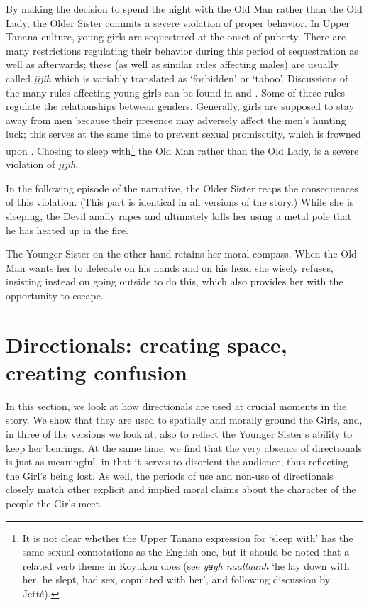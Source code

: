 By making the decision to spend the night with the Old Man rather than the Old Lady, the Older Sister commits a severe violation of proper behavior. In Upper Tanana culture, young girls are sequestered at the onset of puberty. There are many restrictions regulating their behavior during this period of sequestration as well as afterwards; these (as well as similar rules affecting males) are usually called {\em įįjih} which is variably translated as `forbidden' or `taboo'. Discussions of the many rules affecting young girls can be found in \citet{TyoneM1996} and \citet{DavidCforthc}. Some of these rules regulate the relationships between genders. Generally, girls are supposed to stay away from men because their presence may adversely affect the men's hunting luck; this serves at the same time to prevent sexual promiscuity, which is frowned upon \citep[174, 187, 190]{GuedonM1974}. Chosing to sleep with\footnote{It is not clear whether the Upper Tanana expression for `sleep with' has the same sexual connotations as the English one, but it should be noted that a related verb theme in Koyukon does (see \citealp[496]{JetteJJonesE2000} {\em yʉgh naaltaanh} `he lay down with her, he slept, had sex, copulated with her', and following discussion by Jetté).}  the Old Man rather than the Old Lady, is a severe violation of {\em įįjih}.

In the following episode of the narrative, the Older Sister reaps the consequences of this violation. (This part is identical in all versions of the story.) While she is sleeping, the Devil anally rapes and ultimately kills her using a metal pole that he has heated up in the fire.

The Younger Sister on the other hand retains her moral compass. When the Old Man wants her to defecate on his hands and on his head she wisely refuses, insisting instead on going outside to do this, which also provides her with the opportunity to escape.

\section{Directionals: creating space, creating confusion}
\label{section:directionals-space-creation}

In this section, we look at how directionals are used at crucial moments in the story. We show that they are used to spatially and morally ground the Girls, and, in three of the versions we look at, also to reflect the Younger Sister's ability to keep her bearings. At the same time, we find that the very absence of directionals is just as meaningful, in that it serves to disorient the audience, thus reflecting the Girl's being lost. As well, the periods of use and non-use of directionals closely match other explicit and implied moral claims about the character of the people the Girls meet.

